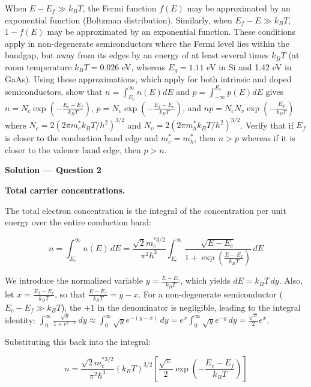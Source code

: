 \begin{question}[Question 2]
When $E - E_f \gg k_B T$, the Fermi function $f(E)$ may be approximated by an exponential function (Boltzman distribution). Similarly, when $E_f - E \gg k_B T$, $1 - f(E)$ may be approximated by an exponential function. These conditions apply in non-degenerate semiconductors where the Fermi level lies within the bandgap, but away from its edges by an energy of at least several times $k_B T$ (at room temperature $k_B T = 0.026$ eV, whereas $E_g = 1.11$ eV in Si and 1.42 eV in GaAs). Using these approximations, which apply for both intrinsic and doped semiconductors, show that $n = \int_{E_c}^\infty n(E) dE$ and $p = \int_{-\infty}^{E_v} p(E) dE$ gives $n = N_c \exp\left(-\frac{E_c - E_f}{k_B T}\right)$, $p = N_v \exp\left(-\frac{E_f - E_v}{k_B T}\right)$, and $np = N_c N_v \exp\left(-\frac{E_g}{k_B T}\right)$ where $N_c = 2(2\pi m_e^* k_B T/h^2)^{3/2}$ and $N_v = 2(2\pi m_h^* k_B T/h^2)^{3/2}$. Verify that if $E_f$ is closer to the conduction band edge and $m_e^* = m_h^*$, then $n > p$ whereas if it is closer to the valence band edge, then $p > n$.
\end{question}

\textbf{\large Solution --- Question 2}

\textbf{Total carrier concentrations.}

The total electron concentration is the integral of the concentration per unit energy over the entire conduction band:

\begin{equation*}
  n = \int_{E_c}^{\infty} n(E)\,dE = \frac{\sqrt{2} m_e^{* 3/2}}{\pi^2 \hbar^3} \int_{E_c}^{\infty} \frac{\sqrt{E - E_c}}{1 + \exp\left(\frac{E-E_f}{k_B T}\right)}\,dE
\end{equation*}

We introduce the normalized variable $y = \frac{E - E_c}{k_B T}$, which yields $dE = k_B T\,dy$. Also, let $x = \frac{E_f - E_c}{k_B T}$, so that $\frac{E-E_f}{k_B T} = y - x$. 
For a non-degenerate semiconductor ($E_c - E_f \gg k_B T$), the $+1$ in the denominator is negligible, leading to the integral identity:
$\int_{0}^{\infty} \frac{\sqrt{y}}{1 + e^{y-x}}\,dy \approx \int_{0}^{\infty} \sqrt{y} e^{-(y-x)}\,dy = e^x \int_{0}^{\infty} \sqrt{y} e^{-y}\,dy = \frac{\sqrt{\pi}}{2} e^x$.

Substituting this back into the integral:

\begin{equation*}
  n = \frac{\sqrt{2} m_e^{* 3/2}}{\pi^2 \hbar^3} (k_B T)^{3/2} \left[ \frac{\sqrt{\pi}}{2} \exp\left(-\frac{E_c - E_f}{k_B T}\right) \right]
\end{equation*}

